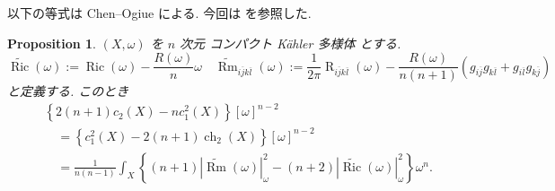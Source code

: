 \documentclass[dvipdfmx,a4paper,11pt]{article} %
\newtheorem{prop}[thm]{Proposition}
\theoremstyle{definition}
\theoremstyle{remark}
\numberwithin{equation}{section}
\begin{document}
以下の等式は Chen--Ogiue \cite{CO75} による. 今回は \cite{Hisa24} を参照した.
\begin{prop}\cite{CO75}\cite{Hisa24} 
\label{prop-miyaoka-yau-curvature}
\((X,\omega)\) を \(n\) 次元 コンパクト Kähler 多様体 とする.
\[
\widetilde{\operatorname{Ric}}(\omega)
:=
\operatorname{Ric}(\omega)
-
\frac{R(\omega)}{n}\omega
\quad 
\widetilde{\operatorname{Rm}}_{i\overline j k\overline l}(\omega)
:=
\frac{1}{2\pi}\operatorname{R}_{i\overline j k\overline l}(\omega)
-
\frac{R(\omega)}{n(n+1)}
\left(
g_{i\overline j}g_{k\overline l}
+
g_{i\overline l}g_{k\overline j}
\right)
\]
と定義する. 
このとき
\[
\begin{aligned}
&\left\{
2(n+1)c_2(X)-nc_{1}^{2}(X)
\right\}[\omega]^{n-2}
\\
&\quad =
\left\{
c_1^2(X)-2(n+1)\operatorname{ch}_2(X)
\right\}[\omega]^{n-2}
\\
&\quad =
\frac{1}{n(n-1)}
\int_X
\left\{
(n+1)\left|\widetilde{\operatorname{Rm}}(\omega)\right|_{\omega}^2
-
(n+2)\left|\widetilde{\operatorname{Ric}}(\omega)\right|_{\omega}^2
\right\}
\omega^n .
\end{aligned}
\]
\end{prop}
\end{document}
